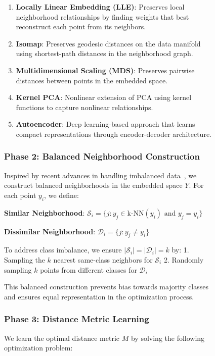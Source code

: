 \documentclass[review]{elsarticle}
\begin{document}
\begin{figure}[htbp]
\begin{enumerate}
\item \textbf{Locally Linear Embedding (LLE)}: Preserves local neighborhood relationships by finding weights that best reconstruct each point from its neighbors.

\item \textbf{Isomap}: Preserves geodesic distances on the data manifold using shortest-path distances in the neighborhood graph.

\item \textbf{Multidimensional Scaling (MDS)}: Preserves pairwise distances between points in the embedded space.

\item \textbf{Kernel PCA}: Nonlinear extension of PCA using kernel functions to capture nonlinear relationships.

\item \textbf{Autoencoder}: Deep learning-based approach that learns compact representations through encoder-decoder architecture.
\end{enumerate}

\subsubsection{Phase 2: Balanced Neighborhood Construction}

Inspired by recent advances in handling imbalanced data~\cite{bs2025distance}, we construct balanced neighborhoods in the embedded space $Y$. For each point $y_i$, we define:

\textbf{Similar Neighborhood}: $\mathcal{S}_i = \{j : y_j \in \text{k-NN}(y_i) \text{ and } y_j = y_i\}$

\textbf{Dissimilar Neighborhood}: $\mathcal{D}_i = \{j : y_j \neq y_i\}$

To address class imbalance, we ensure $|\mathcal{S}_i| = |\mathcal{D}_i| = k$ by:
1. Sampling the $k$ nearest same-class neighbors for $\mathcal{S}_i$
2. Randomly sampling $k$ points from different classes for $\mathcal{D}_i$

This balanced construction prevents bias towards majority classes and ensures equal representation in the optimization process.

\subsubsection{Phase 3: Distance Metric Learning}

We learn the optimal distance metric $M$ by solving the following optimization problem:


\end{figure}
\end{document}
